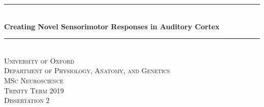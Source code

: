 \documentclass[]{report}
\title{}
\author{Samuel Lippl}
\date{2019-08-14}
\theoremstyle{definition}
\theoremstyle{definition}
\theoremstyle{definition}
\theoremstyle{remark}
\begin{document}
\begin{titlepage}


\newcommand{\HRule}{\rule{\linewidth}{0.5mm}} %

\center %


\HRule \\[0.4cm]
{ \huge \bfseries Creating Novel Sensorimotor Responses in Auditory Cortex}\\[0.4cm] %
\HRule \\[1.5cm]



\textsc{\LARGE University of Oxford}\\[0.5cm] %
\textsc{\Large Department of Physiology, Anatomy, and Genetics}\\[1.5cm]


\textsc{\Large MSc Neuroscience}\\[0.5cm] %
\textsc{\large Trinity Term 2019\\Dissertation 2}\\[0.5cm] %


\vfill


\end{titlepage}
\end{document}
